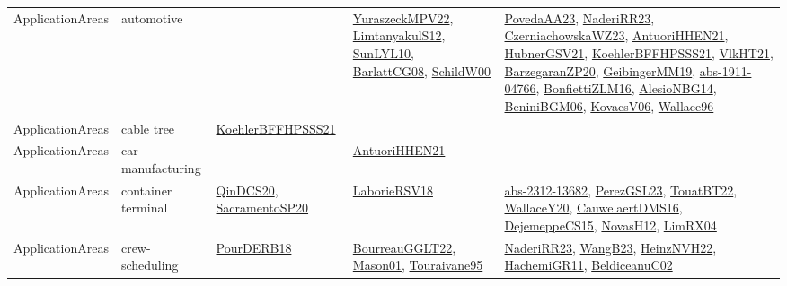 {\begin{longtable}{lp{3cm}>{\raggedright}p{6cm}>{\raggedright}p{6cm}p{8cm}}
ApplicationAreas & automotive &  & \href{articles/YuraszeckMPV22.pdf}{YuraszeckMPV22}\cite{YuraszeckMPV22}, \href{articles/LimtanyakulS12.pdf}{LimtanyakulS12}\cite{LimtanyakulS12}, \href{papers/SunLYL10.pdf}{SunLYL10}\cite{SunLYL10}, \href{papers/BarlattCG08.pdf}{BarlattCG08}\cite{BarlattCG08}, \href{articles/SchildW00.pdf}{SchildW00}\cite{SchildW00} & \href{papers/PovedaAA23.pdf}{PovedaAA23}\cite{PovedaAA23}, \href{articles/NaderiRR23.pdf}{NaderiRR23}\cite{NaderiRR23}, \href{articles/CzerniachowskaWZ23.pdf}{CzerniachowskaWZ23}\cite{CzerniachowskaWZ23}, \href{papers/AntuoriHHEN21.pdf}{AntuoriHHEN21}\cite{AntuoriHHEN21}, \href{articles/HubnerGSV21.pdf}{HubnerGSV21}\cite{HubnerGSV21}, \href{articles/KoehlerBFFHPSSS21.pdf}{KoehlerBFFHPSSS21}\cite{KoehlerBFFHPSSS21}, \href{articles/VlkHT21.pdf}{VlkHT21}\cite{VlkHT21}, \href{papers/BarzegaranZP20.pdf}{BarzegaranZP20}\cite{BarzegaranZP20}, \href{papers/GeibingerMM19.pdf}{GeibingerMM19}\cite{GeibingerMM19}, \href{articles/abs-1911-04766.pdf}{abs-1911-04766}\cite{abs-1911-04766}, \href{papers/BonfiettiZLM16.pdf}{BonfiettiZLM16}\cite{BonfiettiZLM16}, \href{papers/AlesioNBG14.pdf}{AlesioNBG14}\cite{AlesioNBG14}, \href{papers/BeniniBGM06.pdf}{BeniniBGM06}\cite{BeniniBGM06}, \href{papers/KovacsV06.pdf}{KovacsV06}\cite{KovacsV06}, \href{articles/Wallace96.pdf}{Wallace96}\cite{Wallace96}\\
ApplicationAreas & cable tree & \href{articles/KoehlerBFFHPSSS21.pdf}{KoehlerBFFHPSSS21}\cite{KoehlerBFFHPSSS21} &  & \\
ApplicationAreas & car manufacturing &  & \href{papers/AntuoriHHEN21.pdf}{AntuoriHHEN21}\cite{AntuoriHHEN21} & \\
ApplicationAreas & container terminal & \href{articles/QinDCS20.pdf}{QinDCS20}\cite{QinDCS20}, \href{articles/SacramentoSP20.pdf}{SacramentoSP20}\cite{SacramentoSP20} & \href{articles/LaborieRSV18.pdf}{LaborieRSV18}\cite{LaborieRSV18} & \href{articles/abs-2312-13682.pdf}{abs-2312-13682}\cite{abs-2312-13682}, \href{papers/PerezGSL23.pdf}{PerezGSL23}\cite{PerezGSL23}, \href{papers/TouatBT22.pdf}{TouatBT22}\cite{TouatBT22}, \href{articles/WallaceY20.pdf}{WallaceY20}\cite{WallaceY20}, \href{papers/CauwelaertDMS16.pdf}{CauwelaertDMS16}\cite{CauwelaertDMS16}, \href{papers/DejemeppeCS15.pdf}{DejemeppeCS15}\cite{DejemeppeCS15}, \href{articles/NovasH12.pdf}{NovasH12}\cite{NovasH12}, \href{papers/LimRX04.pdf}{LimRX04}\cite{LimRX04}\\
ApplicationAreas & crew-scheduling & \href{articles/PourDERB18.pdf}{PourDERB18}\cite{PourDERB18} & \href{articles/BourreauGGLT22.pdf}{BourreauGGLT22}\cite{BourreauGGLT22}, \href{articles/Mason01.pdf}{Mason01}\cite{Mason01}, \href{papers/Touraivane95.pdf}{Touraivane95}\cite{Touraivane95} & \href{articles/NaderiRR23.pdf}{NaderiRR23}\cite{NaderiRR23}, \href{papers/WangB23.pdf}{WangB23}\cite{WangB23}, \href{articles/HeinzNVH22.pdf}{HeinzNVH22}\cite{HeinzNVH22}, \href{articles/HachemiGR11.pdf}{HachemiGR11}\cite{HachemiGR11}, \href{papers/BeldiceanuC02.pdf}{BeldiceanuC02}\cite{BeldiceanuC02}\\

\end{longtable}}
